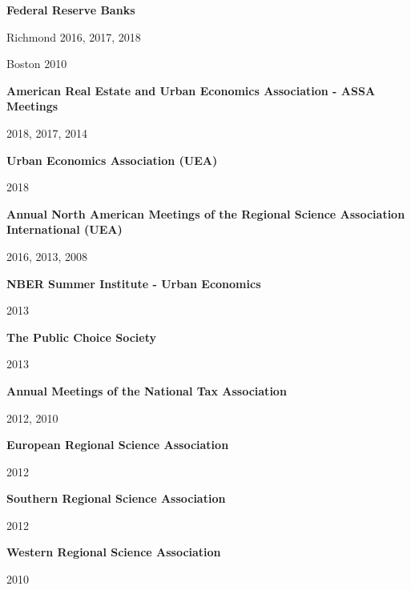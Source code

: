 \documentclass[10pt]{article}
\begin{document}
\begin{outerlist}
\item[] \textbf{Federal Reserve Banks}
    \begin{innerlist}
    \item[] Richmond 2016, 2017, 2018
    \item[] Boston  2010
    \end{innerlist}
\item[] \textbf{American Real Estate and Urban Economics Association - ASSA Meetings}
    \begin{innerlist}
    \item[] 2018, 2017, 2014
    \end{innerlist}
\item[] \textbf{Urban Economics Association (UEA)}
    \begin{innerlist}
    \item[] 2018
    \end{innerlist}
\item[] \textbf{Annual North American Meetings of the Regional Science Association International (UEA)}
    \begin{innerlist}
    \item[] 2016, 2013, 2008
    \end{innerlist}
\item[] \textbf{NBER Summer Institute - Urban Economics}
    \begin{innerlist}
    \item[] 2013
    \end{innerlist}
\item[] \textbf{The Public Choice Society}
    \begin{innerlist}
    \item[] 2013
    \end{innerlist}
\item[] \textbf{Annual Meetings of the National Tax Association}
    \begin{innerlist}
    \item[] 2012, 2010
    \end{innerlist}
\item[] \textbf{European Regional Science Association}
    \begin{innerlist}
    \item[] 2012
    \end{innerlist}
\item[] \textbf{Southern Regional Science Association}
    \begin{innerlist}
    \item[] 2012
    \end{innerlist}
\item[] \textbf{Western Regional Science Association}
    \begin{innerlist}
    \item[] 2010
    \end{innerlist}
\end{outerlist}
\end{document}
